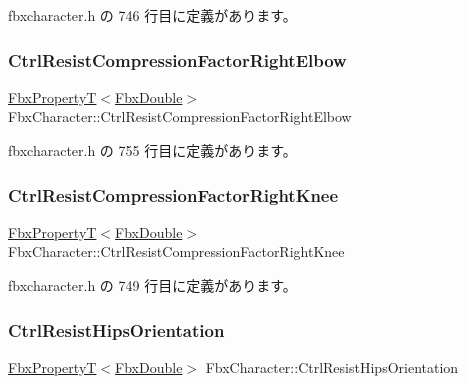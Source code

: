  fbxcharacter.\+h の 746 行目に定義があります。

\mbox{\label{class_fbx_character_af0a8acb958176fece4791944ff171f95}} 
\subsubsection{\texorpdfstring{Ctrl\+Resist\+Compression\+Factor\+Right\+Elbow}{CtrlResistCompressionFactorRightElbow}}
{\footnotesize\ttfamily \hyperlink{class_fbx_property_t}{Fbx\+PropertyT}$<$\hyperlink{fbxtypes_8h_a171e72a1c46fc15c1a6c9c31948c1c5b}{Fbx\+Double}$>$ Fbx\+Character\+::\+Ctrl\+Resist\+Compression\+Factor\+Right\+Elbow}



 fbxcharacter.\+h の 755 行目に定義があります。

\mbox{\label{class_fbx_character_af614d06aabafac970336bf6bcdeace0b}} 
\subsubsection{\texorpdfstring{Ctrl\+Resist\+Compression\+Factor\+Right\+Knee}{CtrlResistCompressionFactorRightKnee}}
{\footnotesize\ttfamily \hyperlink{class_fbx_property_t}{Fbx\+PropertyT}$<$\hyperlink{fbxtypes_8h_a171e72a1c46fc15c1a6c9c31948c1c5b}{Fbx\+Double}$>$ Fbx\+Character\+::\+Ctrl\+Resist\+Compression\+Factor\+Right\+Knee}



 fbxcharacter.\+h の 749 行目に定義があります。

\mbox{\label{class_fbx_character_ae947bede68ae4923aef77c4abe90d30e}} 
\subsubsection{\texorpdfstring{Ctrl\+Resist\+Hips\+Orientation}{CtrlResistHipsOrientation}}
{\footnotesize\ttfamily \hyperlink{class_fbx_property_t}{Fbx\+PropertyT}$<$\hyperlink{fbxtypes_8h_a171e72a1c46fc15c1a6c9c31948c1c5b}{Fbx\+Double}$>$ Fbx\+Character\+::\+Ctrl\+Resist\+Hips\+Orientation}



